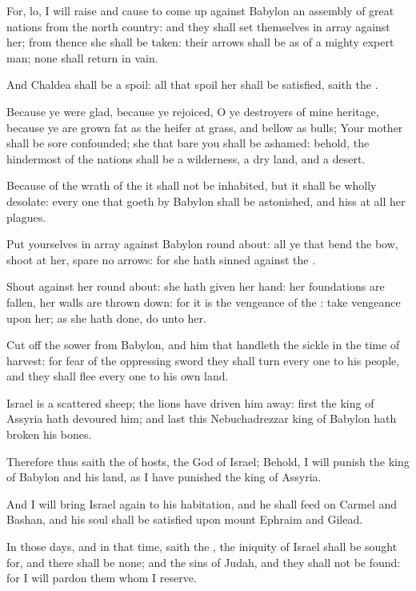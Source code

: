 \verse For, lo, I will raise and cause to come up against Babylon an assembly of great nations from the north country: and they shall set themselves in array against her; from thence she shall be taken: their arrows shall be as of a mighty expert man; none shall return in vain.

\verse And Chaldea shall be a spoil: all that spoil her shall be satisfied, saith the \LORD.

\verse Because ye were glad, because ye rejoiced, O ye destroyers of mine heritage, because ye are grown fat as the heifer at grass, and bellow as bulls; \verse Your mother shall be sore confounded; she that bare you shall be ashamed: behold, the hindermost of the nations shall be a wilderness, a dry land, and a desert.

\verse Because of the wrath of the \LORD it shall not be inhabited, but it shall be wholly desolate: every one that goeth by Babylon shall be astonished, and hiss at all her plagues.

\verse Put yourselves in array against Babylon round about: all ye that bend the bow, shoot at her, spare no arrows: for she hath sinned against the \LORD.

\verse Shout against her round about: she hath given her hand: her foundations are fallen, her walls are thrown down: for it is the vengeance of the \LORD: take vengeance upon her; as she hath done, do unto her.

\verse Cut off the sower from Babylon, and him that handleth the sickle in the time of harvest: for fear of the oppressing sword they shall turn every one to his people, and they shall flee every one to his own land.

\verse Israel is a scattered sheep; the lions have driven him away: first the king of Assyria hath devoured him; and last this Nebuchadrezzar king of Babylon hath broken his bones.

\verse Therefore thus saith the \LORD of hosts, the God of Israel; Behold, I will punish the king of Babylon and his land, as I have punished the king of Assyria.

\verse And I will bring Israel again to his habitation, and he shall feed on Carmel and Bashan, and his soul shall be satisfied upon mount Ephraim and Gilead.

\verse In those days, and in that time, saith the \LORD, the iniquity of Israel shall be sought for, and there shall be none; and the sins of Judah, and they shall not be found: for I will pardon them whom I reserve.

